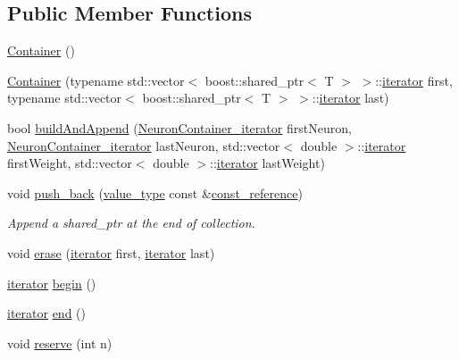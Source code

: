 \subsection*{Public Member Functions}
\begin{DoxyCompactItemize}
\item 
\hyperlink{class_container_ab17ce1f67243b28abcd4c8113a72524c}{Container} ()
\item 
\hyperlink{class_container_a50bd420b4bf50e613882112ac73de796}{Container} (typename std::vector$<$ boost::shared\_\-ptr$<$ T $>$ $>$::\hyperlink{class_container_afe880028d8304353129f47cd1d28c20a}{iterator} first, typename std::vector$<$ boost::shared\_\-ptr$<$ T $>$ $>$::\hyperlink{class_container_afe880028d8304353129f47cd1d28c20a}{iterator} last)
\item 
bool \hyperlink{class_container_afeba0e92ae041e241e5dbc882225315e}{buildAndAppend} (\hyperlink{_a_m_o_r_e_8h_a36be90b8d9f454d85104cd4a44467e00}{NeuronContainer\_\-iterator} firstNeuron, \hyperlink{_a_m_o_r_e_8h_a36be90b8d9f454d85104cd4a44467e00}{NeuronContainer\_\-iterator} lastNeuron, std::vector$<$ double $>$::\hyperlink{class_container_afe880028d8304353129f47cd1d28c20a}{iterator} firstWeight, std::vector$<$ double $>$::\hyperlink{class_container_afe880028d8304353129f47cd1d28c20a}{iterator} lastWeight)
\item 
void \hyperlink{class_container_a3c543f72952c30d3eda5202815833f98}{push\_\-back} (\hyperlink{class_container_aa44714b9a736d2cfd2e01a87ad1c001b}{value\_\-type} const \&\hyperlink{class_container_a9aaab0502055ee85ce5d3633fbca2675}{const\_\-reference})
\begin{DoxyCompactList}\small\item\em Append a shared\_\-ptr at the end of collection. \end{DoxyCompactList}\item 
void \hyperlink{class_container_a7a34b07b4e412ba1e999389065b8edb8}{erase} (\hyperlink{class_container_afe880028d8304353129f47cd1d28c20a}{iterator} first, \hyperlink{class_container_afe880028d8304353129f47cd1d28c20a}{iterator} last)
\item 
\hyperlink{class_container_afe880028d8304353129f47cd1d28c20a}{iterator} \hyperlink{class_container_ac5e2a75311f6e6a690ca67603490ddb1}{begin} ()
\item 
\hyperlink{class_container_afe880028d8304353129f47cd1d28c20a}{iterator} \hyperlink{class_container_a266eabe62963d6909d3aca7f105e203e}{end} ()
\item 
void \hyperlink{class_container_aa3cbae68ebeed649c52eb3805a30fb75}{reserve} (int n)

\end{DoxyCompactItemize}
